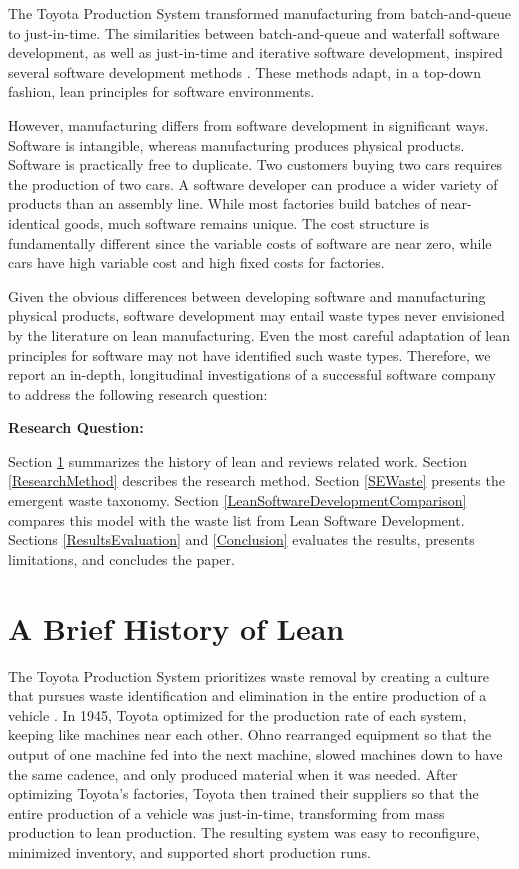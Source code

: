The Toyota Production System \cite{OhnoToyotaProductionSystem, ShingoToyotaProductionSystem} transformed manufacturing from batch-and-queue to just-in-time. The similarities between batch-and-queue and waterfall software development, as well as just-in-time and iterative software development, inspired several software development methods \cite{PoppendieckLeanSoftwareDevelopment, AndersonKanban}. These methods adapt, in a top-down fashion, lean principles for software environments. 

However, manufacturing differs from software development in significant ways. Software is intangible, whereas manufacturing produces physical products. Software is practically free to duplicate. Two customers buying two cars requires the production of two cars. A software developer can produce a wider variety of products than an assembly line. While most factories build batches of near-identical goods, much software remains unique. The cost structure is fundamentally different since the variable costs of software are near zero, while cars have high variable cost and high fixed costs for factories. 

Given the obvious differences between developing software and manufacturing physical products, software development may entail waste types never envisioned by the literature on lean manufacturing. Even the most careful adaptation of lean principles for software may not have identified such waste types. Therefore, we report an in-depth, longitudinal investigations of a successful software company to address the following research question: 

\textbf{Research Question: }

Section \ref{HistoryOfLean} summarizes the history of lean and reviews related work. Section \ref{ResearchMethod} describes the research method. Section \ref{SEWaste} presents the emergent waste taxonomy. Section \ref{LeanSoftwareDevelopmentComparison} compares this model with the waste list from Lean Software Development. Sections \ref{ResultsEvaluation} and \ref{Conclusion} evaluates the results, presents limitations, and concludes the paper.

\section{A Brief History of Lean}
\label{HistoryOfLean}
The Toyota Production System prioritizes waste removal by creating a culture that pursues waste identification and elimination in the entire production of a vehicle \cite{OhnoToyotaProductionSystem, ShingoToyotaProductionSystem}. In 1945, Toyota optimized for the production rate of each system, keeping like machines near each other. Ohno rearranged equipment so that the output of one machine fed into the next machine, slowed machines down to have the same cadence, and only produced material when it was needed. After optimizing Toyota's factories, Toyota then trained their suppliers so that the entire production of a vehicle was just-in-time, transforming from mass production to lean production. The resulting  system was easy to reconfigure, minimized inventory, and supported short production runs.  

